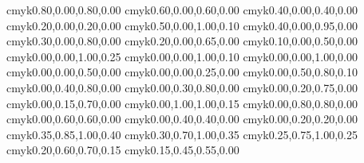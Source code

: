 \definecolor{darkgreen}          {cmyk}{0.80,0.00,0.80,0.00}
\definecolor{green}              {cmyk}{0.60,0.00,0.60,0.00}
\definecolor{lightgreen}         {cmyk}{0.40,0.00,0.40,0.00}
\definecolor{verylightgreen}     {cmyk}{0.20,0.00,0.20,0.00}
\definecolor{verydarklimegreen}  {cmyk}{0.50,0.00,1.00,0.10}
\definecolor{darklimegreen}      {cmyk}{0.40,0.00,0.95,0.00}
\definecolor{limegreen}          {cmyk}{0.30,0.00,0.80,0.00}
\definecolor{lightlimegreen}     {cmyk}{0.20,0.00,0.65,0.00}
\definecolor{verylightlimegreen} {cmyk}{0.10,0.00,0.50,0.00}
\definecolor{verydarkyellow}     {cmyk}{0.00,0.00,1.00,0.25}
\definecolor{darkyellow}         {cmyk}{0.00,0.00,1.00,0.10}
\definecolor{yellow}             {cmyk}{0.00,0.00,1.00,0.00}
\definecolor{lightyellow}        {cmyk}{0.00,0.00,0.50,0.00}
\definecolor{verylightyellow}    {cmyk}{0.00,0.00,0.25,0.00}
\definecolor{verydarkorange}     {cmyk}{0.00,0.50,0.80,0.10}
\definecolor{darkorange}         {cmyk}{0.00,0.40,0.80,0.00}
\definecolor{orange}             {cmyk}{0.00,0.30,0.80,0.00}
\definecolor{lightorange}        {cmyk}{0.00,0.20,0.75,0.00}
\definecolor{verylightorange}    {cmyk}{0.00,0.15,0.70,0.00}
\definecolor{verydarkred}        {cmyk}{0.00,1.00,1.00,0.15}
\definecolor{darkred}            {cmyk}{0.00,0.80,0.80,0.00}
\definecolor{red}                {cmyk}{0.00,0.60,0.60,0.00}
\definecolor{lightred}           {cmyk}{0.00,0.40,0.40,0.00}
\definecolor{verylightred}       {cmyk}{0.00,0.20,0.20,0.00}
\definecolor{verydarkbrown}     {cmyk}{0.35,0.85,1.00,0.40}
\definecolor{darkbrown}         {cmyk}{0.30,0.70,1.00,0.35}
\definecolor{brown}             {cmyk}{0.25,0.75,1.00,0.25}
\definecolor{lightbrown}        {cmyk}{0.20,0.60,0.70,0.15}
\definecolor{verylightbrown}    {cmyk}{0.15,0.45,0.55,0.00}

